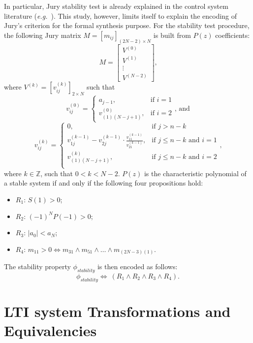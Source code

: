 \documentclass[runningheads,a4paper]{llncs}
\begin{document}
In particular, Jury stability test is already explained in the control system 
literature ({\it e.g.}~\cite{fadali}). This study, however, limits itself to 
explain the encoding of Jury's criterion for the formal synthesis purpose. 
For the stability  test procedure, the following Jury matrix 
$M=[m_{ij}]_{(2N-2)\times N}$ is built  from $P(z)$ coefficients:
$$
M=\left[
\begin{matrix}
  V^{(0)} \\
  V^{(1)} \\
  \vdots \\
  V^{(N-2)}
 \end{matrix}
\right]\mbox{,}
$$
\noindent where $V^{(k)}=[v^{(k)}_{ij}]_{2\times N}$ such that
$$
v^{(0)}_{ij}=\begin{cases} 
a_{j-1}, & \mbox{if } i=1 \\   v^{(0)}_{(1)(N-j+1)}, & \mbox{if } i=2 
\end{cases}\mbox{, and} 
$$
$$
v^{(k)}_{ij}=\begin{cases} 
0, & \mbox{if } j>n-k\\
v^{(k-1)}_{1j}-v^{(k-1)}_{2j}\cdot\frac{v^{(k-1)}_{11}}{v^{(k-1)}_{21}}, & \mbox{if } j\leq n-k  \mbox{ and } i=1 \\
v^{(k)}_{(1)(N-j+1)}, & \mbox{if } j\leq n-k \mbox{ and } i=2 \\
\end{cases} \mbox{,}
$$
\noindent where $k\in\mathbb{Z}$, such that $0<k<N-2$. $P(z)$ is the 
characteristic polynomial of a stable system if and only if the following 
four propositions hold:
\begin{itemize}
\item $R_{1}$: $S(1)>0$;
\item $R_{2}$: $(-1)^{N}P(-1)>0$;
\item $R_{3}$: $\vert{a_{0}}\vert <a_{N}$;
\item $R_{4}$: $m_{11}>0\iff m_{31}\wedge m_{51}\wedge \dots \wedge m_{(2N-3)(1)}$.
\end{itemize}

The stability property $\phi_{stability}$ is then encoded as follows:
$$
\phi_{stability}\iff \ (R_{1} \wedge R_{2} \wedge R_{3} \wedge R_{4}).
$$


\section{LTI system Transformations and Equivalencies} \label{sec:appendix}
\end{document}
